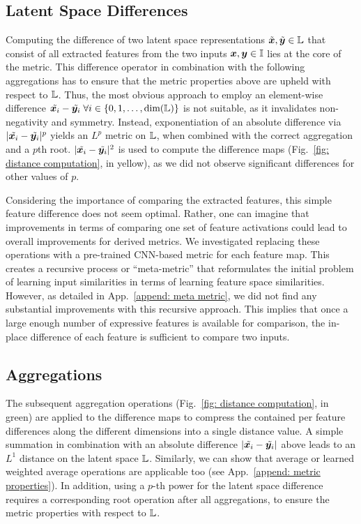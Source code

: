 \documentclass{article}
\begin{document}
\subsection{Latent Space Differences} 
Computing the difference of two latent space representations $\tilde{{\bm{x}}}, \tilde{{\bm{y}}} \in {\mathbb{L}}$ that consist of all extracted features from the two inputs ${\bm{x}},{\bm{y}} \in {\mathbb{I}}$ lies at the core of the metric. This difference operator in combination with the following aggregations has to ensure that the metric properties above are upheld with respect to ${\mathbb{L}}$. Thus, the most obvious approach to employ an element-wise difference $\tilde{{\bm{x}}_i}-\tilde{{\bm{y}}_i} \;\forall i \in \left\{ 0,1,\dotsc,\text{dim}({\mathbb{L}}) \right\}$ is not suitable, as it invalidates non-negativity and symmetry.
Instead, exponentiation of an absolute difference via $\lvert \tilde{{\bm{x}}_i}-\tilde{{\bm{y}}_i} \rvert^p$ yields an $L^p$ metric on ${\mathbb{L}}$, when combined with the correct aggregation and a $p$th root. $\lvert \tilde {{\bm{x}}_i}-\tilde{{\bm{y}}_i} \rvert^2$ is used to compute the difference maps (Fig.~\ref{fig: distance computation}, in yellow), as we did not observe significant differences for other values of $p$.

Considering the importance of comparing the extracted features, this simple feature difference does not seem optimal. Rather, one can imagine that improvements in terms of comparing one set of feature activations could lead to overall improvements for derived metrics. We investigated replacing these operations with a pre-trained CNN-based metric for each feature map. This creates a recursive process or ``meta-metric'' that reformulates the initial problem of learning input similarities in terms of learning feature space similarities.
However, as detailed in App.~\ref{append: meta metric}, we did not find any substantial improvements with this recursive approach. This implies that once a large enough number of expressive features is available for comparison, the in-place difference of each feature is sufficient to compare two inputs.


\subsection{Aggregations}
The subsequent aggregation operations (Fig.~\ref{fig: distance computation}, in green) are applied to the difference maps to compress the contained per feature differences along the different dimensions into a single distance value. 
A simple summation in combination with an absolute difference $\lvert \tilde{{\bm{x}}_i}-\tilde{{\bm{y}}_i} \rvert$ above leads to an $L^1$ distance on the latent space ${\mathbb{L}}$. Similarly, we can show that average or learned weighted average operations are applicable too (see App.~\ref{append: metric properties}). In addition, using a $p$-th power for the latent space difference requires a corresponding root operation after all aggregations, to ensure the metric properties with respect to ${\mathbb{L}}$.
\end{document}
